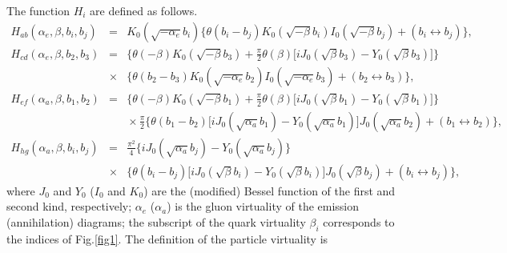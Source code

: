 \documentclass[preprint,superscriptaddress,nofootinbib]{revtex4}
\begin{document}
\begin{appendix}
  The function $H_{i}$ are defined as follows.
   \begin{eqnarray}
   H_{ab}({\alpha}_{e},{\beta},b_{i},b_{j})
   &=& K_{0}(\sqrt{-{\alpha}_{e}}b_{i})
   \Big\{ {\theta}(b_{i}-b_{j})
   K_{0}(\sqrt{-{\beta}}b_{i})
   I_{0}(\sqrt{-{\beta}}b_{j})
   + (b_{i}{\leftrightarrow}b_{j}) \Big\}
   \label{hab}, \\
   H_{cd}({\alpha}_{e},{\beta},b_{2},b_{3}) &=&
   \Big\{ {\theta}(-{\beta}) K_{0}(\sqrt{-{\beta}}b_{3})
  +\frac{{\pi}}{2} {\theta}({\beta}) \Big[
   iJ_{0}(\sqrt{{\beta}}b_{3})
   -Y_{0}(\sqrt{{\beta}}b_{3}) \Big] \Big\}
   \nonumber \\ &{\times}&
   \Big\{ {\theta}(b_{2}-b_{3})
   K_{0}(\sqrt{-{\alpha}_{e}}b_{2})
   I_{0}(\sqrt{-{\alpha}_{e}}b_{3})
   + (b_{2}{\leftrightarrow}b_{3}) \Big\}
   \label{hcd}, \\
   H_{ef}({\alpha}_{a},{\beta},b_{1},b_{2}) &=&
   \Big\{ {\theta}(-{\beta}) K_{0}(\sqrt{-{\beta}}b_{1})
  +\frac{{\pi}}{2} {\theta}({\beta}) \Big[
   iJ_{0}(\sqrt{{\beta}}b_{1})
   -Y_{0}(\sqrt{{\beta}}b_{1}) \Big] \Big\}
   \nonumber \\ & & \!\!\!\!\!\!\!\!\!\!\!\!\!\!\!\!\!\!\!\!\!\!\!\!
  {\times} \frac{{\pi}}{2} \Big\{ {\theta}(b_{1}-b_{2})
   \Big[ iJ_{0}(\sqrt{{\alpha}_{a}}b_{1})
   -Y_{0}(\sqrt{{\alpha}_{a}}b_{1}) \Big]
   J_{0}(\sqrt{{\alpha}_{a}}b_{2})
   + (b_{1}{\leftrightarrow}b_{2}) \Big\}
   \label{hef}, \\
  H_{hg}({\alpha}_{a},{\beta},b_{i},b_{j}) &=&
  \frac{{\pi}^{2}}{4}
  \Big\{ iJ_{0}(\sqrt{{\alpha}_{a}}b_{j})
   -Y_{0}(\sqrt{{\alpha}_{a}}b_{j}) \Big\}
   \nonumber \\ &{\times}&
   \Big\{ {\theta}(b_{i}-b_{j})
   \Big[ iJ_{0}(\sqrt{{\beta}}b_{i})
   -Y_{0}(\sqrt{{\beta}}b_{i}) \Big]
   J_{0}(\sqrt{{\beta}}b_{j})
   + (b_{i}{\leftrightarrow}b_{j}) \Big\}
   \label{hgh},
   \end{eqnarray}
  where $J_{0}$ and $Y_{0}$ ($I_{0}$ and $K_{0}$) are the
  (modified) Bessel function of the first and second kind,
  respectively;
  ${\alpha}_{e}$ (${\alpha}_{a}$) is the
  gluon virtuality of the emission (annihilation)
  diagrams;
  the subscript of the quark virtuality ${\beta}_{i}$
  corresponds to the indices of Fig.\ref{fig1}.
  The definition of the particle virtuality is

\end{appendix}
\end{document}
